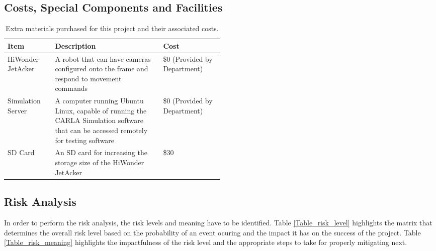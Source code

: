 \documentclass[titlepage,draft]{article}
\begin{document}
\subsection{Costs, Special Components and Facilities}
\begin{table}[H]
	\centering
	\begin{tabular}{@{}lp{0.5\linewidth}l@{}}
		\toprule
		\textbf{Item}     & \textbf{Description}                                                                                                                 & \textbf{Cost}                \\ \midrule
		HiWonder JetAcker & A robot that can have cameras configured onto the frame and respond to movement commands                                             & \$0 (Provided by Department) \\ \midrule
		Simulation Server & A computer running Ubuntu Linux, capable of running the CARLA Simulation software that can be accessed remotely for testing software & \$0 (Provided by Department) \\ \midrule
		SD Card           & An SD card for increasing the storage size of the HiWonder JetAcker                                                                  & \$30                         \\ \bottomrule
	\end{tabular}
	\caption{Extra materials purchased for this project and their associated costs.}
	\label{tab:costs}
\end{table}

\subsection{Risk Analysis}

In order to perform the risk analysis, the risk levels and meaning have to be identified. Table \ref{Table_risk_level} highlights the matrix that determines the overall risk level based on the probability of an event ocuring and the impact it has on the success of the project. Table \ref{Table_risk_meaning} highlights the impactfulness of the risk level and the appropriate steps to take for properly mitigating next.
\end{document}
